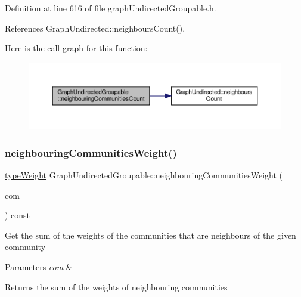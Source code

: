 Definition at line 616 of file graph\+Undirected\+Groupable.\+h.



References Graph\+Undirected\+::neighbours\+Count().

Here is the call graph for this function\+:
\nopagebreak
\begin{figure}[H]
\begin{center}
\leavevmode
\includegraphics[width=350pt]{classGraphUndirectedGroupable_aaf488071a0e3b6cf96b29ae1af8df02f_cgraph}
\end{center}
\end{figure}
\mbox{\label{classGraphUndirectedGroupable_ae8d5d8cea2c1dfba0b4e7110100f2973}} 
\subsubsection{\texorpdfstring{neighbouring\+Communities\+Weight()}{neighbouringCommunitiesWeight()}}
{\footnotesize\ttfamily \hyperlink{edge_8h_a2e7ea3be891ac8b52f749ec73fee6dd2}{type\+Weight} Graph\+Undirected\+Groupable\+::neighbouring\+Communities\+Weight (\begin{DoxyParamCaption}\item[{const \hyperlink{graphUndirectedGroupable_8h_a914da95c9ea7f14f4b7f875c36818556}{type\+Community} \&}]{com }\end{DoxyParamCaption}) const\hspace{0.3cm}{\ttfamily [inline]}}

Get the sum of the weights of the communities that are neighbours of the given community


\begin{DoxyParams}{Parameters}
{\em com} & \\
\hline
\end{DoxyParams}
\begin{DoxyReturn}{Returns}
the sum of the weights of neighbouring communities 
\end{DoxyReturn}


